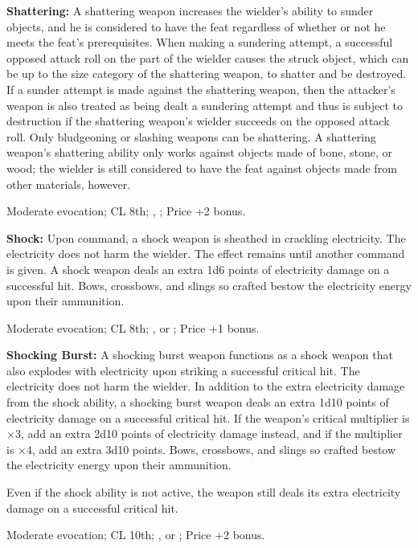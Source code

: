 \textbf{Shattering:} A shattering weapon increases the wielder's ability to sunder objects, and he is considered to have the  feat regardless of whether or not he meets the feat's prerequisites. When making a sundering attempt, a successful opposed attack roll on the part of the wielder causes the struck object, which can be up to the size category of the shattering weapon, to shatter and be destroyed. If a sunder attempt is made against the shattering weapon, then the attacker's weapon is also treated as being dealt a sundering attempt and thus is subject to destruction if the shattering weapon's wielder  succeeds on the opposed attack roll. Only bludgeoning or slashing weapons can be shattering. A shattering weapon's shattering ability only works against objects made of bone, stone, or wood; the wielder is still considered to have the  feat against objects made from other materials, however.

Moderate evocation; CL 8th; , ; Price +2 bonus.


\textbf{Shock:} Upon command, a shock weapon is sheathed in crackling electricity. The electricity does not harm the wielder. The effect remains until another command is given. A shock weapon deals an extra 1d6 points of electricity damage on a successful hit. Bows, crossbows, and slings so crafted bestow the electricity energy upon their ammunition.

Moderate evocation; CL 8th; ,  or ; Price +1 bonus.


\textbf{Shocking Burst:} A shocking burst weapon functions as a shock weapon that also explodes with electricity upon striking a successful critical hit. The electricity does not harm the wielder. In addition to the extra electricity damage from the shock ability, a shocking burst weapon deals an extra 1d10 points of electricity damage on a successful critical hit. If the weapon's critical multiplier is $\times3$, add an extra 2d10 points of electricity damage instead, and if the multiplier is $\times4$, add an extra 3d10 points. Bows, crossbows, and slings so crafted bestow the electricity energy upon their ammunition.

Even if the shock ability is not active, the weapon still deals its extra electricity damage on a successful critical hit.

Moderate evocation; CL 10th; ,  or ; Price +2 bonus.


